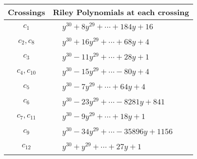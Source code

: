 \documentclass[1p]{elsarticle_modified}
\theoremstyle{definition}
\begin{document}
\begin{tabular}{m{50pt}|m{274pt}}
Crossings & \hspace{64pt}Riley Polynomials at each crossing \\
\hline $$\begin{aligned}c_{1}\end{aligned}$$&$\begin{aligned}
&y^{30}+8 y^{29}+\cdots+184 y+16
\end{aligned}$\\
\hline $$\begin{aligned}c_{2},c_{8}\end{aligned}$$&$\begin{aligned}
&y^{30}+16 y^{29}+\cdots+68 y+4
\end{aligned}$\\
\hline $$\begin{aligned}c_{3}\end{aligned}$$&$\begin{aligned}
&y^{30}-11 y^{29}+\cdots+28 y+1
\end{aligned}$\\
\hline $$\begin{aligned}c_{4},c_{10}\end{aligned}$$&$\begin{aligned}
&y^{30}-15 y^{29}+\cdots-80 y+4
\end{aligned}$\\
\hline $$\begin{aligned}c_{5}\end{aligned}$$&$\begin{aligned}
&y^{30}-7 y^{29}+\cdots+64 y+4
\end{aligned}$\\
\hline $$\begin{aligned}c_{6}\end{aligned}$$&$\begin{aligned}
&y^{30}-23 y^{29}+\cdots-8281 y+841
\end{aligned}$\\
\hline $$\begin{aligned}c_{7},c_{11}\end{aligned}$$&$\begin{aligned}
&y^{30}-9 y^{29}+\cdots+18 y+1
\end{aligned}$\\
\hline $$\begin{aligned}c_{9}\end{aligned}$$&$\begin{aligned}
&y^{30}-34 y^{29}+\cdots-35896 y+1156
\end{aligned}$\\
\hline $$\begin{aligned}c_{12}\end{aligned}$$&$\begin{aligned}
&y^{30}+y^{29}+\cdots+27 y+1
\end{aligned}$\\
\hline
\end{tabular}\\~\\
\end{document}
